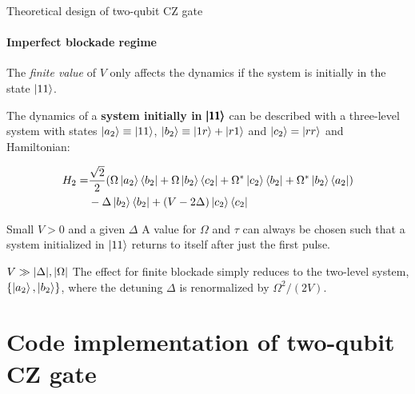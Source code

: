 \documentclass[8pt]{beamer}
\begin{document}
	
	\begin{frame}{Theoretical design of two-qubit CZ gate}
	\framesubtitle{Imperfect blockade regime}	
	
	The \textit{finite value} of $V$ only affects the dynamics if the system is initially in the state $\ket{11}$.
	
	\medskip
	
    The dynamics of a \textbf{system initially in} $\pmb{\ket{11}}$ can be described with a \alert{three-level system} with states $\ket{a_2}\equiv\ket{11}$, $\ket{b_2}\equiv \ket{1r}+\ket{r1}$ and $\ket{c_2}=\ket{rr}$ and Hamiltonian:
    
    \begin{equation}
    \begin{aligned}
        H_2 =& \frac{\sqrt{2}}{2} \qty( \Omega \ket{a_2}\bra{b_2} + \Omega \ket{b_2}\bra{c_2} +
        \Omega^* \ket{c_2}\bra{b_2} + \Omega^*\ket{b_2}\bra{a_2}) 
        \\
        & - \Delta \ket{b_2}\bra{b_2} 
        + (V-2\Delta)\ket{c_2}\bra{c_2}
    \end{aligned}
        \label{eq:imperfect-H_2}
    \end{equation}

    \medskip
    \medskip

	    \begin{block}{Small $V>0$ and a given $\Delta$}
           A value for $\Omega$ and $\tau$ can always be chosen such that a system initialized in $\ket{11}$ returns to itself after just the first pulse.
        \end{block}
        
	    \begin{block}{$V \gg \abs{\Delta},\abs{\Omega}$}
          The effect for finite blockade simply reduces to the two-level system, $\{ \ket{a_2}, \ket{b_2}\}$, where the detuning $\Delta$ is renormalized by $\Omega^2/(2V)$. 
        \end{block}
        

    
	\end{frame}	
	
	\section{Code implementation of two-qubit CZ gate}
\end{document}

